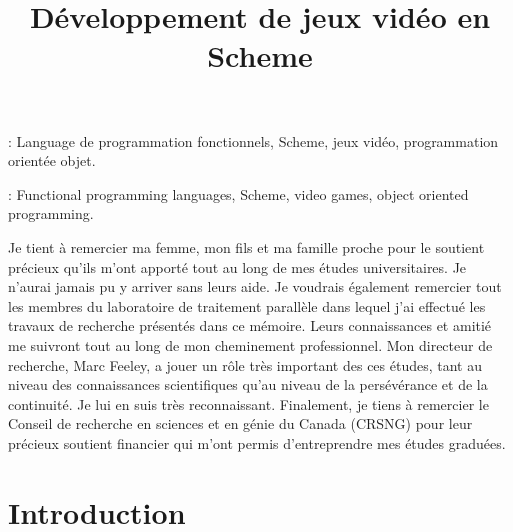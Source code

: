 \documentclass[12pt,oneside,letterpaper,francais]{book}
\title{Développement de jeux vidéo en Scheme}
\begin{document}
\setcounter{page}{1}
 \PagesCouverture

\resume


\vspace{2em}

: Language de programmation fonctionnels,
Scheme, jeux vidéo, programmation orientée objet.

\abstract



\vspace{2em}

: Functional programming languages, Scheme,
video games, object oriented programming.



 
\tabledesmatieres

\listedestableaux

\listedesfigures


\remerciements

Je tient à remercier ma femme, mon fils et ma famille proche pour le
soutient précieux qu'ils m'ont apporté tout au long de mes études
universitaires. Je n'aurai jamais pu y arriver sans leurs aide. Je
voudrais également remercier tout les membres du laboratoire de
traitement parallèle dans lequel j'ai effectué les travaux de
recherche présentés dans ce mémoire. Leurs connaissances et amitié me
suivront tout au long de mon cheminement professionnel. Mon directeur
de recherche, Marc Feeley, a jouer un rôle très important des ces
études, tant au niveau des connaissances scientifiques qu'au niveau de
la persévérance et de la continuité. Je lui en suis très
reconnaissant. Finalement, je tiens à remercier le Conseil de
recherche en sciences et en génie du Canada (CRSNG) pour leur précieux
soutient financier qui m'ont permis d'entreprendre mes études
graduées.

% 

\debutchapitres

\chapter{Introduction}
\label{Chap:Intro}
\end{document}

